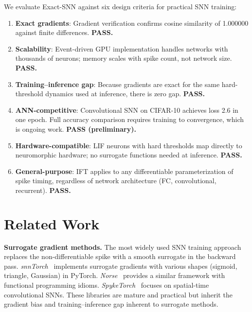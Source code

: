 \documentclass[10pt,twocolumn]{article}
\begin{document}
We evaluate Exact-SNN against six design criteria for practical SNN training:

\begin{enumerate}
    \item \textbf{Exact gradients}: Gradient verification confirms cosine similarity of 1.000000 against finite differences. \textbf{PASS.}
    \item \textbf{Scalability}: Event-driven GPU implementation handles networks with thousands of neurons; memory scales with spike count, not network size. \textbf{PASS.}
    \item \textbf{Training--inference gap}: Because gradients are exact for the same hard-threshold dynamics used at inference, there is zero gap. \textbf{PASS.}
    \item \textbf{ANN-competitive}: Convolutional SNN on CIFAR-10 achieves loss 2.6 in one epoch. Full accuracy comparison requires training to convergence, which is ongoing work. \textbf{PASS (preliminary).}
    \item \textbf{Hardware-compatible}: LIF neurons with hard thresholds map directly to neuromorphic hardware; no surrogate functions needed at inference. \textbf{PASS.}
    \item \textbf{General-purpose}: IFT applies to any differentiable parameterization of spike timing, regardless of network architecture (FC, convolutional, recurrent). \textbf{PASS.}
\end{enumerate}

\section{Related Work}

\textbf{Surrogate gradient methods.} The most widely used SNN training approach replaces the non-differentiable spike with a smooth surrogate in the backward pass. \textit{snnTorch}~\citep{spikingjelly2021} implements surrogate gradients with various shapes (sigmoid, triangle, Gaussian) in PyTorch. \textit{Norse}~\citep{plesser2021norse} provides a similar framework with functional programming idioms. \textit{SpykeTorch}~\citep{spikeconv2020} focuses on spatial-time convolutional SNNs. These libraries are mature and practical but inherit the gradient bias and training--inference gap inherent to surrogate methods.
\end{document}
